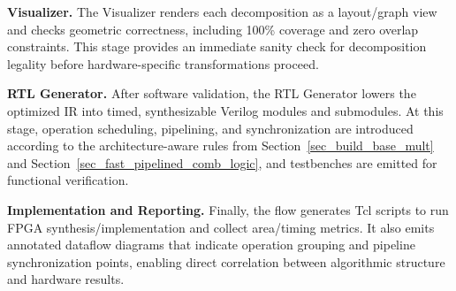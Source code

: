 \noindent\textbf{Visualizer.}
The Visualizer renders each decomposition as a layout/graph view and checks geometric correctness, including 100\% coverage and zero overlap constraints.
This stage provides an immediate sanity check for decomposition legality before hardware-specific transformations proceed.



\noindent\textbf{RTL Generator.}
After software validation, the RTL Generator lowers the optimized IR into timed, synthesizable Verilog modules and submodules.
At this stage, operation scheduling, pipelining, and synchronization are introduced according to the architecture-aware rules from Section~\ref{sec_build_base_mult} and Section~\ref{sec_fast_pipelined_comb_logic}, and testbenches are emitted for functional verification.

\noindent\textbf{Implementation and Reporting.}
Finally, the flow generates Tcl scripts to run FPGA synthesis/implementation and collect area/timing metrics.
It also emits annotated dataflow diagrams that indicate operation grouping and pipeline synchronization points, enabling direct correlation between algorithmic structure and hardware results.
